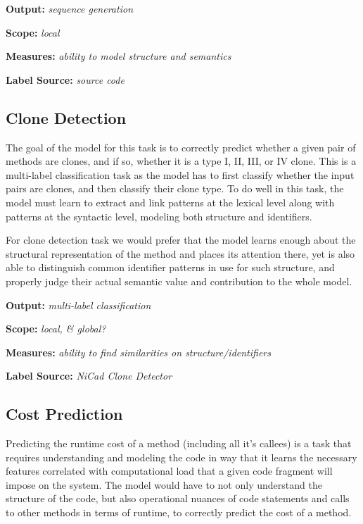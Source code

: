 \documentclass[sigplan,review,anonymous]{acmart}\settopmatter{printfolios=true,printccs=false,printacmref=false}
\begin{document}
\noindent
\textbf{Output:} \textit{sequence generation}

\noindent
\textbf{Scope:} \textit{local}

\noindent
\textbf{Measures:} \textit{ability to model structure and semantics}

\noindent
\textbf{Label Source:} \textit{source code}



\subsection{Clone Detection}
The goal of the model for this task is to correctly predict whether a given pair of methods are clones, and if so, whether it is a type I, II, III, or IV clone. This is a multi-label classification task as the model has to first classify whether the input pairs are clones, and then classify their clone type. To do well in this task, the model must learn to extract and link patterns at the lexical level along with patterns at the syntactic level, modeling both structure and identifiers. 

For clone detection task we would prefer that the model learns enough about the structural representation of the method and places its attention there, yet is also able to distinguish common identifier patterns in use for such structure, and properly judge their actual semantic value and contribution to the whole model. \newline

\noindent
\textbf{Output:} \textit{multi-label classification}

\noindent
\textbf{Scope:} \textit{local, & global?}

\noindent
\textbf{Measures:} \textit{ability to find similarities on structure/identifiers}

\noindent
\textbf{Label Source:} \textit{NiCad Clone Detector}

\subsection{Cost Prediction}
Predicting the runtime cost of a method (including all it's callees) is a task that requires understanding and modeling the code in way that it learns the necessary features correlated with computational load that a given code fragment will impose on the system. The model would have to not only understand the structure of the code, but also operational nuances of code statements and calls to other methods in terms of runtime, to correctly predict the cost of a method. 
\end{document}
